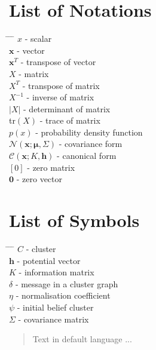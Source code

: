 \documentclass[12pt,oneside,openany,a4paper, %
afrikaans,english,
]{memoir}
\numberwithin{equation}{chapter}
\begin{document}
\chapter{List of Notations}
\begin{tabbing}
\hspace*{1em}\= \hspace*{5em} \= \hspace*{3em} \= \kill %
\> $x$	\> - \> scalar\\
\> $\bm{x}$	\> - \> vector\\
\> $\bm{x}^T$	\> - \> transpose of vector\\
\> $X$ \> - \> matrix\\
\> $X^T$ \> - \> transpose of matrix\\
\> $X^{-1}$ \> - \> inverse of matrix\\
\> $|X|$ \> - \> determinant of matrix\\
\> tr$(X)$ \> - \> trace of matrix\\
\> $p(x)$ \> - \> probability density function\\
\> $\mathcal{N}(\bm{x}; \bm{\mu}, \Sigma)$ \> - \> covariance form\\
\> $\mathcal{C}(\bm{x}; K, \bm{h})$ \> - \> canonical form\\
\> $[0]$ \> - \> zero matrix\\
\> $\bm{0}$ \> - \> zero vector
\end{tabbing}

\chapter{List of Symbols}
\begin{tabbing}
\hspace*{1em}\= \hspace*{5em} \= \hspace*{3em} \= \kill %
\> $C$	\> - \> cluster\\
\> $\bm{h}$	\> - \> potential vector\\
\> $K$	\> - \> information matrix\\
\> $\delta$ \> - \> message in a cluster graph\\
\> $\eta$ \> - \> normalisation coefficient\\
\> $\psi$ \> - \> initial belief cluster\\
\> $\Sigma$ \> - \> covariance matrix
\end{tabbing}
\begin{abstract}
Text in default language ...
\end{abstract}
\end{document}
